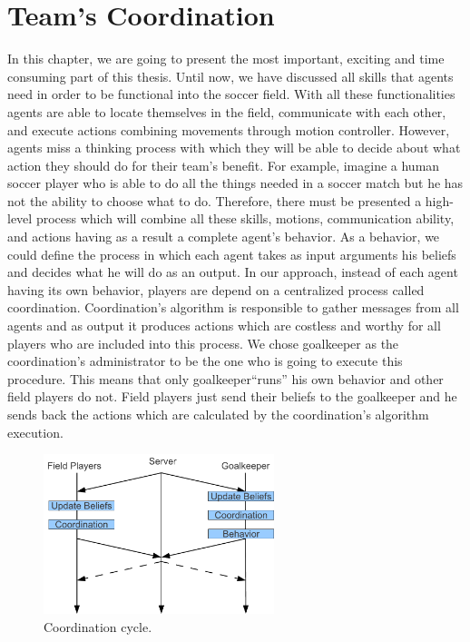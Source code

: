 \chapter{Team's Coordination}
\label{Coordination}

In this chapter, we are going to present the most important, exciting and time consuming part of this thesis. Until now, we have discussed all skills that agents need in order to be functional into the soccer field. With all these functionalities agents are able to locate themselves in the field, communicate with each other, and execute actions combining movements through motion controller. However, agents miss a thinking process with which they will be able to decide about what action they should do for their team's benefit. For example, imagine a human soccer player who is able to do all the things needed in a soccer match but he has not the ability to choose what to do. Therefore, there must be presented a high-level process which will combine all these skills, motions, communication ability, and actions having as a result a complete agent's behavior. As a behavior, we could define the process in which each agent takes as input arguments his beliefs and decides what he will do as an output. In our approach, instead of each agent having its own behavior, players are depend on a centralized process called coordination.  Coordination's algorithm is responsible to gather messages from all agents and as output it produces actions which are costless and worthy for all players who are included into this process. We chose goalkeeper as the coordination's administrator to be the one who is going to execute this procedure. This means that only goalkeeper``runs'' his own behavior and other field players do not. Field players just send their beliefs to the goalkeeper and he sends back the actions which are calculated by the coordination's algorithm execution.


\begin{figure}[t!]
\centering
  \includegraphics[width=0.6\textwidth]{Chapter4/figures/CoordinationCycle.pdf}
  \caption{Coordination cycle.} 
  \label{fig:CoordinationCycle}
\end{figure}


